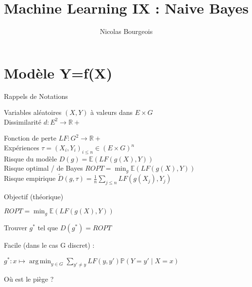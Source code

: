 \documentclass[11pt]{beamer}
\title{Machine Learning IX : Naive Bayes}
\author{Nicolas Bourgeois}
\date{}
\DeclareMathOperator*{\argmin}{arg\,min}
\begin{document}
\begin{frame}
\maketitle
\end{frame}

\begin{frame}
\tableofcontents
\end{frame}

\section{Modèle Y=f(X)}

\begin{frame}{Rappels de Notations}

Variables aléatoires $(X,Y)$ à valeurs dans $E \times G$\\

Dissimilarité $d:E^2 \rightarrow \mathbb{R}+ $

Fonction de perte $LF : G^2 \rightarrow \mathbb{R}+$\\

Expériences $\tau = (X_i,Y_i)_{i\leq n} \in (E \times G)^n$\\

Risque du modèle $D(g) = \mathbb{E} \left(LF(g(X),Y)\right)$\\

Risque optimal / de Bayes $ROPT = \min_g\mathbb{E} \left(LF(g(X),Y)\right)$\\

Risque empirique $\tilde{D}(g,\tau) = \frac{1}{n}\sum_{j \leq n} LF(g(X_j),Y_j)$

\end{frame}

\begin{frame}{Objectif (théorique)}

$ROPT = \min_g\mathbb{E} \left(LF(g(X),Y)\right)$\\

\vspace{0.2cm}

Trouver $g^*$ tel que $D(g^*)=ROPT$ \\

\vspace{0.2cm}

\pause

Facile (dans le cas G discret) :\\

\vspace{0.2cm}

$g^*:x\mapsto \argmin_{y \in G} \sum_{y'\neq y}LF(y,y')\mathbb{P}(Y=y'\mid X=x)$\\

\vspace{0.2cm}

\pause

Où est le piège ?

\end{frame}
\end{document}
